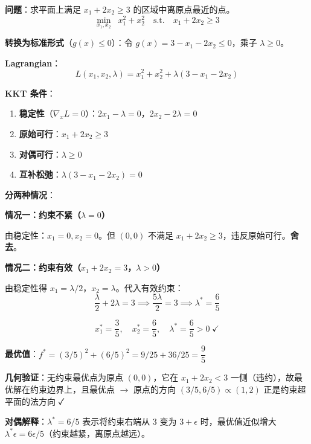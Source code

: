 \documentclass[12pt, a4paper]{ctexart}
\begin{document}
\begin{blackboard}

\textbf{问题}：求平面上满足 $x_1 + 2x_2 \geq 3$ 的区域中离原点最近的点。
\[
\min_{x_1, x_2} \;\; x_1^2 + x_2^2 \quad \text{s.t.} \quad x_1 + 2x_2 \geq 3
\]

\textbf{转换为标准形式}（$g(x) \leq 0$）：令 $g(x) = 3 - x_1 - 2x_2 \leq 0$，乘子 $\lambda \geq 0$。

\textbf{Lagrangian}：
\[
L(x_1, x_2, \lambda) = x_1^2 + x_2^2 + \lambda(3 - x_1 - 2x_2)
\]

\textbf{KKT 条件}：
\begin{enumerate}
    \item \textbf{稳定性}（$\nabla_x L = 0$）：$2x_1 - \lambda = 0$，$2x_2 - 2\lambda = 0$
    \item \textbf{原始可行}：$x_1 + 2x_2 \geq 3$
    \item \textbf{对偶可行}：$\lambda \geq 0$
    \item \textbf{互补松弛}：$\lambda(3 - x_1 - 2x_2) = 0$
\end{enumerate}

\textbf{分两种情况}：

\textbf{情况一：约束不紧（$\lambda = 0$）}

由稳定性：$x_1 = 0, x_2 = 0$。但 $(0,0)$ 不满足 $x_1 + 2x_2 \geq 3$，违反原始可行。\textbf{舍去}。

\textbf{情况二：约束有效（$x_1 + 2x_2 = 3$，$\lambda > 0$）}

由稳定性得 $x_1 = \lambda/2$，$x_2 = \lambda$。代入有效约束：
\[
\frac{\lambda}{2} + 2\lambda = 3 \implies \frac{5\lambda}{2} = 3 \implies \lambda^* = \frac{6}{5}
\]

\[
x_1^* = \frac{3}{5}, \quad x_2^* = \frac{6}{5}, \quad \lambda^* = \frac{6}{5} > 0 \;\checkmark
\]

\textbf{最优值}：$f^* = (3/5)^2 + (6/5)^2 = 9/25 + 36/25 = \dfrac{9}{5}$

\textbf{几何验证}：无约束最优点为原点 $(0,0)$，它在 $x_1+2x_2 < 3$ 一侧（违约），故最优解在约束边界上，且最优点 $\to$ 原点的方向 $(3/5, 6/5) \propto (1, 2)$ 正是约束超平面的法方向 ✓

\textbf{对偶解释}：$\lambda^* = 6/5$ 表示将约束右端从 3 变为 $3+\epsilon$ 时，最优值近似增大 $\lambda^* \epsilon = 6\epsilon/5$（约束越紧，离原点越远）。

\end{blackboard}
\end{document}
